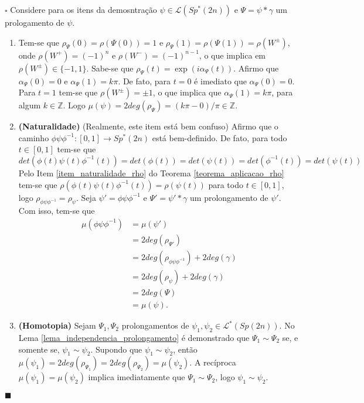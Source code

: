 \documentclass[12pt]{book}
\newenvironment{prova}[1]{$\square$ #1}{\hfill$\blacksquare$}
\newcommand{\caminhosespeciais}[1]{\mathcal{L}^{*}(#1)}
\newcommand{\caminhos}{\mathcal{L}}
\newcommand{\gruposimpletico}[1]{Sp(#1)}
\newcommand{\gruposimpleticonaodegenerado}[1]{Sp^{#1}(2n)}
\newcommand{\inteiros}{\mathbb{Z}}
\newcommand{\intervalo}{[0,1]}
\newcommand{\vermelho}[1]{{\color{red}#1}}
\begin{document}
	\begin{prova}
		
		Considere para os itens da demosntração $\psi \in \caminhos{(\gruposimpleticonaodegenerado{*})}$ e $\Psi=\psi * \gamma$ um prologamento de $\psi$.
		\begin{enumerate}
			\item Tem-se que $\rho_{\Psi}(0) = \rho(\Psi(0)) = 1$ e $\rho_{\Psi}(1) = \rho(\Psi(1)) = \rho(W^{\pm})$, onde $\rho(W^{+})=(-1)^{n}$ e $\rho(W^{-})=(-1)^{n-1}$, o que implica em $\rho(W^{\pm}) \in \{ -1,1\}$. Sabe-se que $\rho_{\Psi}(t) = \exp(i\alpha_{\Psi}(t))$. Afirmo que $\alpha_{\Psi}(0)=0$ e $\alpha_{\Psi}(1)=k\pi$. De fato, para $t=0$ é imediato que $\alpha_{\Psi}(0)=0$. Para $t=1$ tem-se que $\rho(W^{\pm}) = \pm 1$, o que implica que $\alpha_{\Psi}(1) = k\pi$, para algum $k\in \inteiros$. Logo $\mu(\psi) = 2deg(\rho_{\Psi}) = (k\pi-0)/\pi \in \inteiros$.
			
			\item \textbf{(Naturalidade)} \vermelho{(Realmente, este item está bem confuso)} Afirmo que o caminho $\phi\psi\phi^{-1}: \intervalo \to \gruposimpleticonaodegenerado{*}$ está bem-definido. De fato, para todo $t\in \intervalo$ tem-se que $det(\phi(t)\psi(t)\phi^{-1}(t)) = det(\phi(t)) = det(\psi(t)) = det(\phi^{-1}(t)) = det(\psi(t)) $Pelo Item \ref{item_naturalidade_rho} do Teorema \ref{teorema_aplicacao_rho} tem-se que  $\rho(\phi(t)\psi(t)\phi^{-1}(t)) = \rho(\psi(t))$ para todo $t\in \intervalo$, logo $\rho_{\phi\psi\phi^{-1}} = \rho_{\psi}$. Seja $\psi' = \phi\psi\phi^{-1}$ e $\Psi' = \psi'*\gamma$ um prolongamento de $\psi'$. Com isso, tem-se que 
			$$
			\begin{aligned}
			\mu(\phi\psi\phi^{-1})
			&=\mu(\psi')
			\\
			&= 2deg(\rho_{\Psi'})
			\\
			&= 2deg(\rho_{\phi\psi\phi^{-1}}) + 2deg(\gamma)
			\\
			&=2deg(\rho_{\psi}) + 2deg(\gamma)
			\\
			&=2deg(\Psi)
			\\
			&= \mu(\psi).			
			\end{aligned}
			$$
			
			\item \textbf{(Homotopia)} Sejam $\Psi_{1}, \Psi_{2}$ prolongamentos de $\psi_{1}, \psi_{2} \in \caminhosespeciais{\gruposimpletico{2n}}$. No Lema \ref{lema_independencia_prolongamento} é demonstrado que $\Psi_{1}\sim \Psi_{2}$ se, e somente se, $\psi_{1}\sim \psi_{2}$. Supondo que $\psi_{1}\sim \psi_{2}$, então $\mu(\psi_{1}) = 2deg(\rho_{\Psi_{1}}) = 2deg(\rho_{\Psi_{2}}) = \mu(\psi_{2})$. A recíproca $\mu(\psi_{1}) = \mu(\psi_{2})$ implica imediatamente que $\Psi_{1}\sim \Psi_{2}$, logo $\psi_{1}\sim \psi_{2}$.
			

\end{enumerate}
\end{prova}
\end{document}
